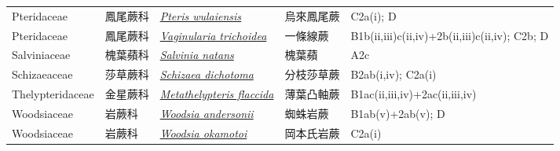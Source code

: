 {\begin{longtable}{p{2.5cm}p{2.5cm}p{4.5cm}p{2.5cm}p{3cm}}
    Pteridaceae & 鳳尾蕨科 & \href{http://www.theplantlist.org/tpl1.1/search?q=Pteris+wulaiensis}{\textit{Pteris wulaiensis} } & 烏來鳳尾蕨 & C2a(i); D \index{Pteris@\textit{Pteris}!wulaiensis@\textit{wulaiensis}}  \index{烏來鳳尾蕨} \\
    Pteridaceae & 鳳尾蕨科 & \href{http://www.theplantlist.org/tpl1.1/search?q=Vaginularia+trichoidea}{\textit{Vaginularia trichoidea} } & 一條線蕨 & B1b(ii,iii)c(ii,iv)+2b(ii,iii)c(ii,iv); C2b; D \index{Vaginularia@\textit{Vaginularia}!trichoidea@\textit{trichoidea}}  \index{一條線蕨} \\
    Salviniaceae & 槐葉蘋科 & \href{http://www.theplantlist.org/tpl1.1/search?q=Salvinia+natans}{\textit{Salvinia natans} } & 槐葉蘋 & A2c \index{Salvinia@\textit{Salvinia}!natans@\textit{natans}}  \index{槐葉蘋} \\
    Schizaeaceae & 莎草蕨科 & \href{http://www.theplantlist.org/tpl1.1/search?q=Schizaea+dichotoma}{\textit{Schizaea dichotoma} } & 分枝莎草蕨 & B2ab(i,iv); C2a(i) \index{Schizaea@\textit{Schizaea}!dichotoma@\textit{dichotoma}}  \index{分枝莎草蕨} \\
    Thelypteridaceae & 金星蕨科 & \href{http://www.theplantlist.org/tpl1.1/search?q=Metathelypteris+flaccida}{\textit{Metathelypteris flaccida} } & 薄葉凸軸蕨 & B1ac(ii,iii,iv)+2ac(ii,iii,iv) \index{Metathelypteris@\textit{Metathelypteris}!flaccida@\textit{flaccida}}  \index{薄葉凸軸蕨} \\
    Woodsiaceae & 岩蕨科 & \href{http://www.theplantlist.org/tpl1.1/search?q=Woodsia+andersonii}{\textit{Woodsia andersonii} } & 蜘蛛岩蕨 & B1ab(v)+2ab(v); D \index{Woodsia@\textit{Woodsia}!andersonii@\textit{andersonii}}  \index{蜘蛛岩蕨} \\
    Woodsiaceae & 岩蕨科 & \href{http://www.theplantlist.org/tpl1.1/search?q=Woodsia+okamotoi}{\textit{Woodsia okamotoi} } & 岡本氏岩蕨 & C2a(i) \index{Woodsia@\textit{Woodsia}!okamotoi@\textit{okamotoi}}  \index{岡本氏岩蕨} \\
    \bottomrule
        \end{longtable}
        }
    